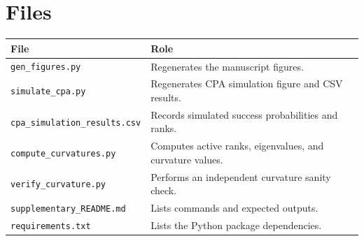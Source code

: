 \documentclass[11pt,a4paper]{article}
\begin{document}
\section{Files}

\begin{center}
\begin{tabular}{ll}
\toprule
File & Role \\
\midrule
\texttt{gen\_figures.py} & Regenerates the manuscript figures. \\
\texttt{simulate\_cpa.py} & Regenerates CPA simulation figure and CSV results. \\
\texttt{cpa\_simulation\_results.csv} & Records simulated success probabilities and ranks. \\
\texttt{compute\_curvatures.py} & Computes active ranks, eigenvalues, and curvature values. \\
\texttt{verify\_curvature.py} & Performs an independent curvature sanity check. \\
\texttt{supplementary\_README.md} & Lists commands and expected outputs. \\
\texttt{requirements.txt} & Lists the Python package dependencies. \\
\bottomrule
\end{tabular}
\end{center}
\end{document}
